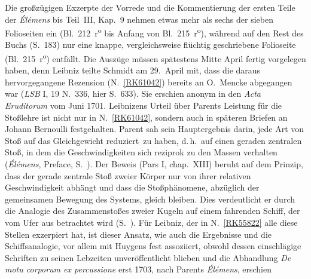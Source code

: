 \begin{ledgroup}
%
Die großzügigen Exzerpte der Vorrede und die Kommentierung der ersten Teile der \cite{01500}\textit{Élémens} bis Teil~III, Kap.~9 nehmen etwas mehr als sechs der sieben Folioseiten ein (Bl.~212~r\textsuperscript{o} bis Anfang von Bl.~215~r\textsuperscript{o}),
%
während auf den Rest des Buchs (S.~183) nur eine knappe, vergleichsweise flüchtig geschriebene Folioseite (Bl.~215~r\textsuperscript{o}) entfällt. %
\pend
%
\pstart
Die Auszüge müssen spätestens Mitte April fertig vorgelegen haben, denn Leibniz teilte
\protect{}Schmidt 
%
am 29.\ April mit, dass die daraus hervorgegangene Rezension (N.~\ref{RK61042}) bereits an
\protect{}O.~Mencke 
%
abgegangen war (\cite{02058}\textit{LSB} I, 19 N.~336, hier S.~633).
%
Sie erschien anonym in den \cite{01023}\textit{Acta Eruditorum} vom Juni 1701.
\pend
%
%
\pstart
%
Leibnizens Urteil über 
%
\protect{}Parents 
%
Leistung für die Stoßlehre ist nicht nur in N.~\ref{RK61042}, sondern auch in späteren Briefen an 
%
\protect{}Johann Bernoulli festgehalten.
%
\protect{}Parent
%
sah sein Hauptergebnis darin, jede Art von Stoß
%
\glqq auf das Gleichgewicht reduziert\grqq\ zu haben, d.\,h.\ auf einen geraden zentralen Stoß, 
%
in dem die Geschwindigkeiten sich reziprok zu den Massen verhalten 
%
(\cite{01500}\textit{Élémens}, Preface, S.~\rbrack).
%
Der Beweis 
%
(\cite{01500}Pars I, chap.~XIII) beruht auf dem Prinzip, dass der gerade zentrale Stoß zweier Körper 
%
nur von ihrer relativen Geschwindigkeit abhängt und dass die Stoßphänomene, abzüglich der gemeinsamen Bewegung des Systems, gleich bleiben. 
%
Dies verdeutlicht er durch die Analogie des Zusammenstoßes zweier Kugeln auf einem fahrenden Schiff, der vom Ufer aus betrachtet wird (S.~\rbrack).
%
Für Leibniz, der in N.~\ref{RK55822} alle diese Stellen exzerpiert hat, ist dieser Ansatz, wie auch die Ergebnisse und die Schiffsanalogie,
%
vor allem mit \protect{}Huygens fest assoziiert, 
%
obwohl dessen einschlägige Schriften zu seinen Lebzeiten unveröffentlicht blieben
%
und die Abhandlung \cite{00530}\textit{De motu corporum ex percussione} erst 1703, 
%
nach \protect{}Parents \textit{Élémens}, erschien 

\end{ledgroup}
